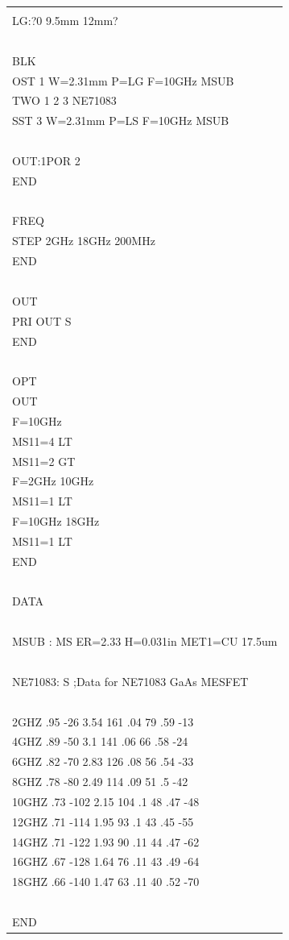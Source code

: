 \begin{longtable}[]{@{}l@{}}
\toprule
\endhead
\begin{minipage}[t]{0.97\columnwidth}\raggedright
\begin{quote}
LS:?0 5.69mm 10mm?\\
LG:?0 9.5mm 12mm?\\
~\\
BLK\\
OST 1 W=2.31mm P=LG F=10GHz MSUB\\
TWO 1 2 3 NE71083\\
SST 3 W=2.31mm P=LS F=10GHz MSUB\\
~\\
OUT:1POR 2\\
END\\
~\\
FREQ\\
STEP 2GHz 18GHz 200MHz\\
END\\
~\\
OUT\\
PRI OUT S\\
END\\
~\\
OPT\\
OUT\\
F=10GHz\\
MS11=4 LT\\
MS11=2 GT\\
F=2GHz 10GHz\\
MS11=1 LT\\
F=10GHz 18GHz\\
MS11=1 LT\\
END\\
~\\
DATA\\
~\\
MSUB : MS ER=2.33 H=0.031in MET1=CU 17.5um\\
~\\
NE71083: S ;Data for NE71083 GaAs MESFET\\
~\\
2GHZ .95 -26 3.54 161 .04 79 .59 -13\\
4GHZ .89 -50 3.1 141 .06 66 .58 -24\\
6GHZ .82 -70 2.83 126 .08 56 .54 -33\\
8GHZ .78 -80 2.49 114 .09 51 .5 -42\\
10GHZ .73 -102 2.15 104 .1 48 .47 -48\\
12GHZ .71 -114 1.95 93 .1 43 .45 -55\\
14GHZ .71 -122 1.93 90 .11 44 .47 -62\\
16GHZ .67 -128 1.64 76 .11 43 .49 -64\\
18GHZ .66 -140 1.47 63 .11 40 .52 -70\\
~\\
END
\end{quote}\strut
\end{minipage}\tabularnewline
\bottomrule
\end{longtable}

